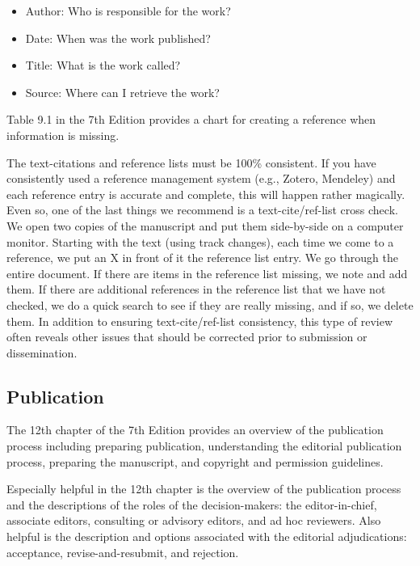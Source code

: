 \documentclass[
  11pt,
]{book}
\providecommand{\tightlist}{%
  \setlength{\itemsep}{0pt}\setlength{\parskip}{0pt}}
\begin{document}
\begin{itemize}
\tightlist
\item
  Author: Who is responsible for the work?
\item
  Date: When was the work published?
\item
  Title: What is the work called?
\item
  Source: Where can I retrieve the work?
\end{itemize}

Table 9.1 in the 7th Edition provides a chart for creating a reference when information is missing.

The text-citations and reference lists must be 100\% consistent. If you have consistently used a reference management system (e.g., Zotero, Mendeley) and each reference entry is accurate and complete, this will happen rather magically. Even so, one of the last things we recommend is a text-cite/ref-list cross check. We open two copies of the manuscript and put them side-by-side on a computer monitor. Starting with the text (using track changes), each time we come to a reference, we put an X in front of it the reference list entry. We go through the entire document. If there are items in the reference list missing, we note and add them. If there are additional references in the reference list that we have not checked, we do a quick search to see if they are really missing, and if so, we delete them. In addition to ensuring text-cite/ref-list consistency, this type of review often reveals other issues that should be corrected prior to submission or dissemination.

\hypertarget{publication}{%
\subsection{Publication}\label{publication}}

The 12th chapter of the 7th Edition provides an overview of the publication process including preparing publication, understanding the editorial publication process, preparing the manuscript, and copyright and permission guidelines.

Especially helpful in the 12th chapter is the overview of the publication process and the descriptions of the roles of the decision-makers: the editor-in-chief, associate editors, consulting or advisory editors, and ad hoc reviewers. Also helpful is the description and options associated with the editorial adjudications: acceptance, revise-and-resubmit, and rejection.
\end{document}
